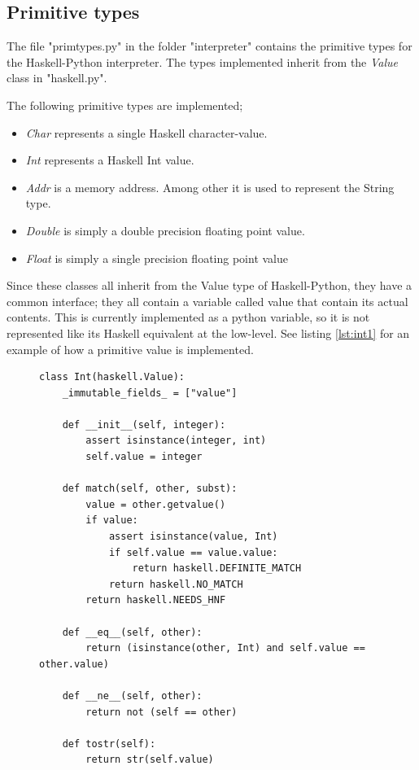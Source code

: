 \subsection*{Primitive types}

The file "primtypes.py" in the folder "interpreter" contains the primitive types
for the Haskell-Python interpreter. The types implemented inherit from the
\emph{Value} class in "haskell.py".

The following primitive types are implemented;

\begin{itemize}
\item \emph{Char} represents a single Haskell character-value.
\item \emph{Int} represents a Haskell Int value.
\item \emph{Addr} is a memory address. Among other it is used to represent
the String type.

\item \emph{Double} is simply a double precision floating point value.
\item \emph{Float} is simply a single precision floating point value
\end{itemize}

Since these classes all inherit from the Value type of Haskell-Python, 
they have a common interface; they all contain a variable called value that
contain its actual contents. This is currently implemented as a python
variable, so it is not represented like its Haskell equivalent at the low-level.
See listing \ref{lst:int1} for an example of how a primitive value is implemented.

\begin{figure}[H]
\lstset{ %
language=Python,
caption=Python class implementing the Haskell Int Value.,
label=lst:int1
}
\begin{lstlisting}
class Int(haskell.Value):
    _immutable_fields_ = ["value"]

    def __init__(self, integer):
        assert isinstance(integer, int)
        self.value = integer

    def match(self, other, subst):
        value = other.getvalue()
        if value:
            assert isinstance(value, Int)
            if self.value == value.value:
                return haskell.DEFINITE_MATCH
            return haskell.NO_MATCH
        return haskell.NEEDS_HNF

    def __eq__(self, other):
        return (isinstance(other, Int) and self.value == other.value)

    def __ne__(self, other):
        return not (self == other)

    def tostr(self):
        return str(self.value)
\end{lstlisting}
\end{figure}


